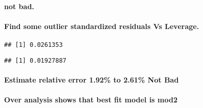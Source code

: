 \documentclass[
]{article}
\newenvironment{Shaded}{\begin{snugshade}}{\end{snugshade}}
\newcommand{\FunctionTok}[1]{\textcolor[rgb]{0.00,0.00,0.00}{#1}}
\newcommand{\NormalTok}[1]{#1}
\newcommand{\OtherTok}[1]{\textcolor[rgb]{0.56,0.35,0.01}{#1}}
\newcommand{\SpecialCharTok}[1]{\textcolor[rgb]{0.00,0.00,0.00}{#1}}
\begin{document}
\hypertarget{not-bad.}{%
\paragraph{not bad.}\label{not-bad.}}

\hypertarget{find-some-outlier-standardized-residuals-vs-leverage.}{%
\paragraph{Find some outlier standardized residuals Vs
Leverage.}\label{find-some-outlier-standardized-residuals-vs-leverage.}}

\begin{Shaded}
\end{Shaded}

\begin{verbatim}
## [1] 0.0261353
\end{verbatim}

\begin{Shaded}
\end{Shaded}

\begin{verbatim}
## [1] 0.01927887
\end{verbatim}

\hypertarget{estimate-relative-error-1.92-to-2.61-not-bad}{%
\paragraph{Estimate relative error 1.92\% to 2.61\% Not
Bad}\label{estimate-relative-error-1.92-to-2.61-not-bad}}

\hypertarget{over-analysis-shows-that-best-fit-model-is-mod2}{%
\paragraph{Over analysis shows that best fit model is
mod2}\label{over-analysis-shows-that-best-fit-model-is-mod2}}
\end{document}
